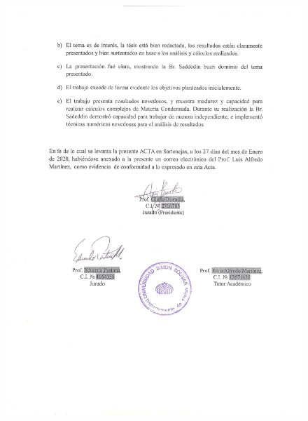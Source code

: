 \begin{figure}
    \centering
    \includegraphics[width=1\columnwidth]{imagenes/ActadefensaSiria2.pdf}
\end{figure}

